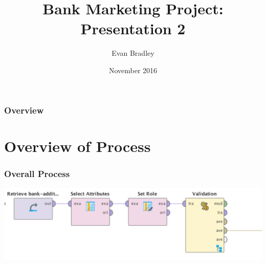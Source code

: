\documentclass{beamer}
\title[Bank Marketing Project]{Bank Marketing Project: Presentation 2} %
\author{Evan Bradley} %
\institute[OU] %
{
Oakland University \\ %
\medskip
\textit{edbradley@oakland.edu} %
}
\date{November 2016} %
\begin{document}
\begin{frame}
	\frametitle{\space}
	\titlepage %
\end{frame}

\begin{frame}
\frametitle{Overview} %
\tableofcontents %
\end{frame}


\section{Overview of Process} %



\begin{frame}
	\frametitle{Overall Process}
  \includegraphics[width=\textwidth,height=\textheight,keepaspectratio]{process}
\end{frame}
\end{document}
